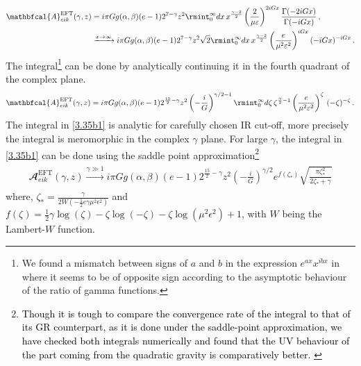 \begin{align}
\begin{split}
\mathbfcal{A}^{\textrm{EFT}}_{eik}(\gamma,z) &
= i\pi G g(\alpha,\beta)(e-1)2^{7-\gamma}z^2 \rmint_0^\infty dx\, x^{\frac{\gamma - 2}{2}} \left( \frac{2}{\mu \varepsilon} \right)^{2iGx} \frac{\Gamma(-2iGx)}{\Gamma(-iGx)}\,,
\\ &\xrightarrow[]{x\to \infty} i\pi G g(\alpha,\beta)(e-1)2^{7-\gamma}z^2\sqrt{2} \rmint_0^\infty dx\, x^{\frac{\gamma - 2}{2}} \left( \frac{e}{\mu^2 \varepsilon^2} \right)^{iGx}  (-i Gx)^{-iGx}\,.
\end{split}
\end{align}
The integral\footnote{We found a mismatch between signs of $a$ and $b$ in the expression $e^{ax}x^{ibx}$ in \cite{Adamo:2024mqn} where it seems to be of opposite sign according to the asymptotic behaviour of the ratio of gamma functions.} can be done by analytically continuing it in the fourth quadrant of the complex plane.
\begin{align}
    \begin{split}
    \mathbfcal{A}^{\textrm{EFT}}_{eik}(\gamma,z)=i\pi G g(\alpha,\beta)(e-1)2^{\frac{15}{2}-\gamma}z^2  \left(-\frac{i}{G}\right)^{\gamma/2-1}\rmint_0^\infty d\zeta\,\zeta^{\frac{\gamma}{2}-1}\left(\frac{e}{\mu^2\varepsilon^2}\right)^{\zeta}\,(-\zeta)^{-\zeta}\,.\label{3.35b1}
    \end{split}
\end{align}
The integral in \eqref{3.35b1} is analytic for carefully chosen IR cut-off, more precisely the integral is meromorphic in the complex $\gamma$ plane. For large $\gamma$, the integral in \eqref{3.35b1} can be done using the saddle point approximation\footnote{\textcolor{black}{Though it is tough to compare the convergence rate of the integral to that of its GR counterpart, as it is done under the saddle-point approximation, we have checked both integrals numerically and found that the UV behaviour of the part coming from the quadratic gravity is comparatively better. }}
\begin{align}
    \begin{split}
         \mathbfcal{A}^{\textrm{EFT}}_{eik}(\gamma,z)\xrightarrow[]{\gamma\gg1}i\pi G g(\alpha,\beta)(e-1)2^{\frac{15}{2}-\gamma}z^2  \left(-\frac{i}{G}\right)^{\gamma/2}e^{f(\zeta_{*})}\sqrt{\frac{\pi\zeta_{*}^2}{2\zeta_{*}+\gamma}}
    \end{split}
\end{align}
where, $\zeta_{*}=\frac{\gamma }{2 {W}\left(-\frac{1}{2} e \gamma  \mu ^2 \epsilon ^2\right)}$ and $f(\zeta)=\frac{1}{2} \gamma  \log (\zeta )-\zeta  \log (-\zeta )-\zeta  \log \left(\mu ^2 \epsilon ^2\right)+1$, with ${W}$ being the {Lambert}-${W} $ function.

